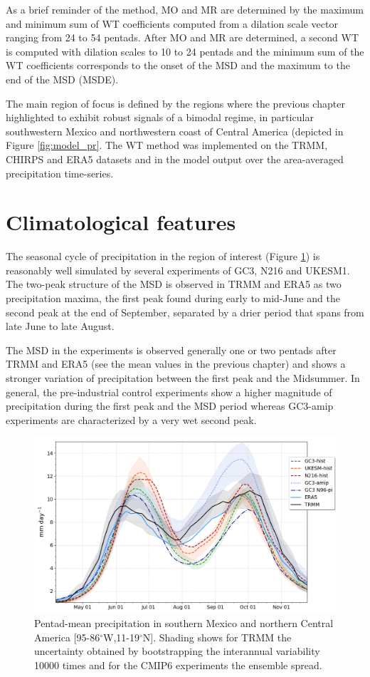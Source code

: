As a brief reminder of the method, MO and MR are determined by the maximum and minimum sum of WT coefficients computed from a dilation scale vector ranging from 24 to 54 pentads. After MO and MR are determined, a second WT is computed with dilation scales to 10 to 24 pentads and the minimum sum of the WT coefficients corresponds to the onset of the MSD and the maximum to the end of the MSD (MSDE). 

The main region of focus is defined by the regions where the previous chapter highlighted to exhibit robust signals of a bimodal regime, in particular southwestern Mexico and northwestern coast of Central America (depicted in Figure \ref{fig:model_pr}. The WT method was implemented on the TRMM, CHIRPS and ERA5 datasets and in the model output over the area-averaged precipitation time-series. 

\section{Climatological features}

The seasonal cycle of precipitation in the region of interest (Figure \ref{fig:msdcaribb}) is reasonably well simulated by several experiments of GC3, N216 and UKESM1.
The two-peak structure of the MSD is observed in TRMM and ERA5 as two precipitation maxima, the first peak found during early to mid-June and the second peak at the end of September, separated by a drier period that spans from late June to late August.  

The MSD in the experiments is observed generally one or two pentads after TRMM and ERA5 (see the mean values in the previous chapter) and shows a stronger variation of precipitation between the first peak and the Midsummer. 
In general, the pre-industrial control experiments show a higher magnitude of precipitation during the first peak and the MSD period whereas GC3-amip experiments are characterized by a very wet second peak. 


\label{sq:msdclim}
 \begin{figure}[t!]
\includegraphics[width=\linewidth]{figures/seasonal_cycle_p3.png}
\caption{Pentad-mean precipitation in southern Mexico and northern Central America [95-86$^\circ$W,11-19$^\circ$N]. Shading shows for TRMM the uncertainty obtained by bootstrapping the interannual variability 10000 times and for the CMIP6 experiments the ensemble spread. }
\label{fig:msdcaribb}
\end{figure}



